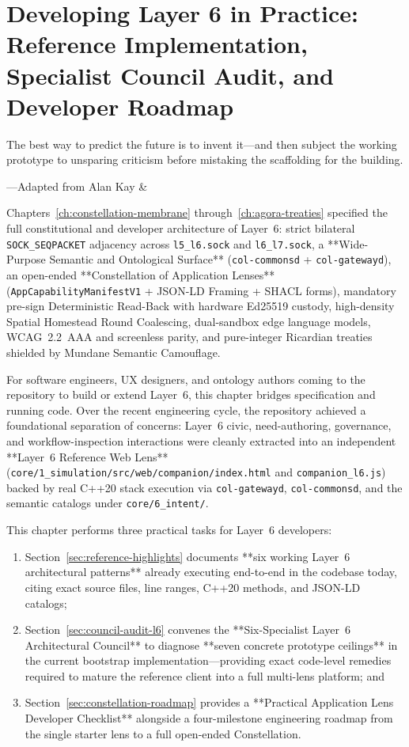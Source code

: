 \chapter{Developing Layer 6 in Practice: Reference Implementation, Specialist Council Audit, and Developer Roadmap}
\label{ch:oasis-council-l6}

\epigraph{The best way to predict the future is to invent it---and then subject the working prototype to unsparing criticism before mistaking the scaffolding for the building.}{---Adapted from Alan Kay \& \textcite{engelbart1962augmenting}}

Chapters~\ref{ch:constellation-membrane} through~\ref{ch:agora-treaties} specified the full constitutional and developer architecture of Layer~6: strict bilateral \texttt{SOCK\_SEQPACKET} adjacency across \texttt{l5\_l6.sock} and \texttt{l6\_l7.sock}, a **Wide-Purpose Semantic and Ontological Surface** (\texttt{col-commonsd} + \texttt{col-gatewayd}), an open-ended **Constellation of Application Lenses** (\texttt{AppCapabilityManifestV1} + JSON-LD Framing + SHACL forms), mandatory pre-sign Deterministic Read-Back with hardware Ed25519 custody, high-density Spatial Homestead Round Coalescing, dual-sandbox edge language models, WCAG~2.2~AAA and screenless parity, and pure-integer Ricardian treaties shielded by Mundane Semantic Camouflage.

For software engineers, UX designers, and ontology authors coming to the repository to build or extend Layer~6, this chapter bridges specification and running code. Over the recent engineering cycle, the repository achieved a foundational separation of concerns: Layer~6 civic, need-authoring, governance, and workflow-inspection interactions were cleanly extracted into an independent **Layer~6 Reference Web Lens** (\texttt{core/1\_simulation/src/web/companion/index.html} and \texttt{companion\_l6.js}) backed by real C++20 stack execution via \texttt{col-gatewayd}, \texttt{col-commonsd}, and the semantic catalogs under \texttt{core/6\_intent/}.

This chapter performs three practical tasks for Layer~6 developers:
\begin{enumerate}
    \item Section~\ref{sec:reference-highlights} documents **six working Layer~6 architectural patterns** already executing end-to-end in the codebase today, citing exact source files, line ranges, C++20 methods, and JSON-LD catalogs;
    \item Section~\ref{sec:council-audit-l6} convenes the **Six-Specialist Layer~6 Architectural Council** to diagnose **seven concrete prototype ceilings** in the current bootstrap implementation---providing exact code-level remedies required to mature the reference client into a full multi-lens platform; and
    \item Section~\ref{sec:constellation-roadmap} provides a **Practical Application Lens Developer Checklist** alongside a four-milestone engineering roadmap from the single starter lens to a full open-ended Constellation.
\end{enumerate}

